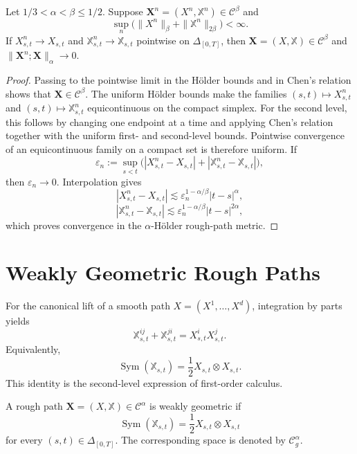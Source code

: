 \begin{lem}
Let $1/3<\alpha<\beta\le1/2$.  Suppose
$\mathbf X^n=(X^n,\mathbb X^n)\in\mathscr C^\beta$ and
\[
  \sup_n\bigl(\|X^n\|_\beta+\|\mathbb X^n\|_{2\beta}\bigr)<\infty.
\]
If $X^n_{s,t}\to X_{s,t}$ and
$\mathbb X^n_{s,t}\to\mathbb X_{s,t}$ pointwise on $\Delta_{[0,T]}$, then
$\mathbf X=(X,\mathbb X)\in\mathscr C^\beta$ and
$\|\mathbf X^n;\mathbf X\|_\alpha\to0$.
\end{lem}

\begin{proof}
Passing to the pointwise limit in the Hölder bounds and in Chen's relation
shows that $\mathbf X\in\mathscr C^\beta$.  The uniform Hölder bounds make the
families $(s,t)\mapsto X^n_{s,t}$ and $(s,t)\mapsto\mathbb X^n_{s,t}$
equicontinuous on the compact simplex.  For the second level, this follows by
changing one endpoint at a time and applying Chen's relation together with the
uniform first- and second-level bounds.  Pointwise convergence of an
equicontinuous family on a compact set is therefore uniform.  If
\[
  \varepsilon_n:=\sup_{s<t}
  \bigl(|X^n_{s,t}-X_{s,t}|+|\mathbb X^n_{s,t}-\mathbb X_{s,t}|\bigr),
\]
then $\varepsilon_n\to0$.  Interpolation gives
\[
  |X^n_{s,t}-X_{s,t}|\lesssim
  \varepsilon_n^{1-\alpha/\beta}|t-s|^\alpha,
\]
\[
  |\mathbb X^n_{s,t}-\mathbb X_{s,t}|\lesssim
  \varepsilon_n^{1-\alpha/\beta}|t-s|^{2\alpha},
\]
which proves convergence in the $\alpha$-Hölder rough-path metric.
\end{proof}

\section{Weakly Geometric Rough Paths}

For the canonical lift of a smooth path $X=(X^1,\ldots,X^d)$, integration by
parts yields
\[
  \mathbb X^{ij}_{s,t}+\mathbb X^{ji}_{s,t}
  =X^i_{s,t}X^j_{s,t}.
\]
Equivalently,
\[
  \operatorname{Sym}(\mathbb X_{s,t})
  =\frac12X_{s,t}\otimes X_{s,t}.
\]
This identity is the second-level expression of first-order calculus.

\begin{de}
A rough path $\mathbf X=(X,\mathbb X)\in\mathscr C^\alpha$ is weakly geometric
if
\[
  \operatorname{Sym}(\mathbb X_{s,t})
  =\frac12X_{s,t}\otimes X_{s,t}
\]
for every $(s,t)\in\Delta_{[0,T]}$.  The corresponding space is denoted by
$\mathscr C_g^\alpha$.
\end{de}

